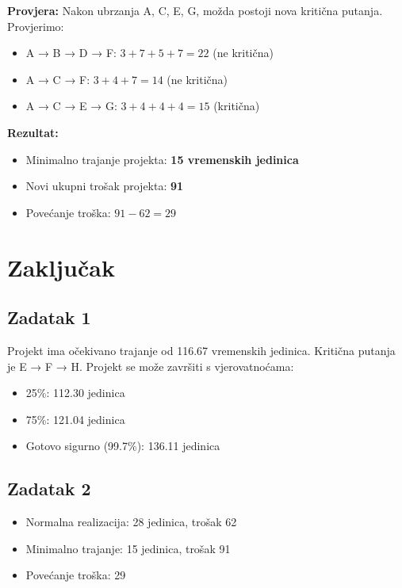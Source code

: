 \documentclass[12pt,a4paper]{article}
\begin{document}
\textbf{Provjera:} Nakon ubrzanja A, C, E, G, možda postoji nova kritična putanja. Provjerimo:
\begin{itemize}
\item A → B → D → F: $3 + 7 + 5 + 7 = 22$ (ne kritična)
\item A → C → F: $3 + 4 + 7 = 14$ (ne kritična)
\item A → C → E → G: $3 + 4 + 4 + 4 = 15$  (kritična)
\end{itemize}

\textbf{Rezultat:}
\begin{itemize}
\item Minimalno trajanje projekta: \textbf{15 vremenskih jedinica}
\item Novi ukupni trošak projekta: \textbf{91}
\item Povećanje troška: $91 - 62 = 29$
\end{itemize}

\section{Zaključak}

\subsection{Zadatak 1}
Projekt ima očekivano trajanje od 116.67 vremenskih jedinica. Kritična putanja je E → F → H. Projekt se može završiti s vjerovatnoćama:
\begin{itemize}
\item 25\%: 112.30 jedinica
\item 75\%: 121.04 jedinica
\item Gotovo sigurno (99.7\%): 136.11 jedinica
\end{itemize}

\subsection{Zadatak 2}
\begin{itemize}
\item Normalna realizacija: 28 jedinica, trošak 62
\item Minimalno trajanje: 15 jedinica, trošak 91
\item Povećanje troška: 29
\end{itemize}
\end{document}

